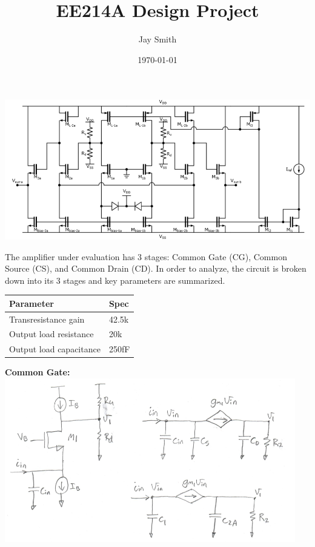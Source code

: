 \documentclass[fleqn]{article}
\title{EE214A Design Project}
\author{Jay Smith}
\date{\today}
\begin{document}
\raggedright
\maketitle
\begin{flushleft}

\includegraphics[scale=0.6]{circuit_architecture}

\large{The amplifier under evaluation has 3 stages: 
Common Gate (CG), Common Source (CS), and Common Drain (CD).  In order to analyze, the circuit is broken down into its 3 stages and key parameters are summarized.}\\
\vspace{5mm} 

\begin{tabular}{ | p{6cm} || p{6cm} | }
\hline
Parameter & Spec\\
\hline
Transresistance gain & 42.5k\\
\hline
Output load resistance & 20k\\
\hline
Output load capacitance & 250fF\\
\hline
\end{tabular}
\vspace{10mm}




\newpage
\textbf{Common Gate:}\\
\includegraphics[scale=1.3]{CG_schematic}


\end{flushleft}
\end{document}
